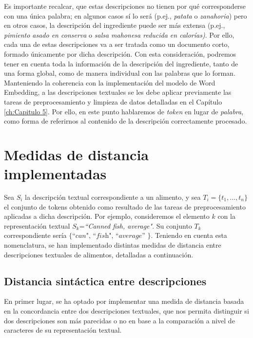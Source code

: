 Es importante recalcar, que estas descripciones no tienen por qué corresponderse con una única palabra; en algunos casos sí lo será (p.ej., \textit{patata} o \textit{zanahoria}) pero en otros casos, la descripción del ingrediente puede ser más extensa (p.ej., \textit{pimiento asado en conserva} o \textit{salsa mahonesa reducida en calorías)}. Por ello, cada una de estas descripciones va a ser tratada como un documento corto, formado únicamente por dicha descripción. Con esta consideración, podremos tener en cuenta toda la información de la descripción del ingrediente, tanto de una forma global, como de manera individual con las palabras que lo forman. Manteniendo la coherencia con la implementación del modelo de Word Embedding, a las descripciones textuales se les debe aplicar previamente las tareas de preprocesamiento y limpieza de datos detalladas en el Capítulo \ref{ch:Capitulo 5}. Por ello, en este punto hablaremos de \textit{token} en lugar de \textit{palabra}, como forma de referirnos al contenido de la descripción correctamente procesado.


\section{Medidas de distancia implementadas}\label{sec:proced_mapeo}

Sea $S_{i}$ la descripción textual correspondiente a un alimento, y sea  $T_{i}=\lbrace t_{1},...,t_{n}\rbrace$ el conjunto de tokens obtenido como resultado de las tareas de preprocesamiento aplicadas a dicha descripción. Por ejemplo, consideremos el elemento $k$ con la representación textual  $S_{k}$=\textit{``Canned  fish, average"}. Su conjunto $T_{k}$ correspondiente sería $\lbrace \textit{``can", ``fish", ``average'' } \rbrace $. Teniendo en cuenta esta nomenclatura, se han implementado distintas medidas de distancia entre descripciones textuales de alimentos, detalladas a continuación.


\subsection{Distancia sintáctica entre descripciones}
    
En primer lugar, se ha optado por implementar una medida de distancia basada en la concordancia entre dos descripciones textuales, que nos permita distinguir si dos descripciones son más parecidas o no en base a la comparación a nivel de caracteres de su representación textual.

